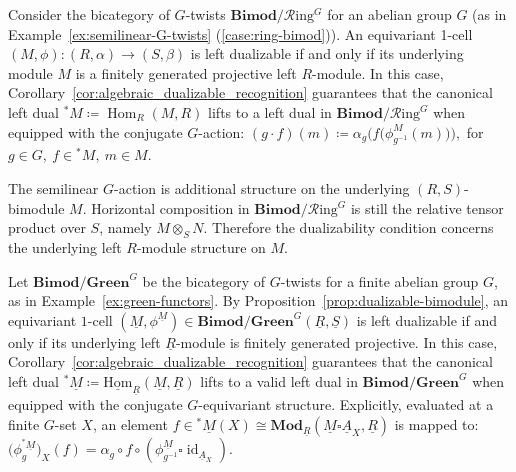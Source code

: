 \documentclass[11pt,oneside]{amsart}
\DeclareMathOperator{\Hom}{Hom}
\DeclareMathOperator{\id}{id}
\numberwithin{equation}{section}
\numberwithin{figure}{section}
\theoremstyle{plain}
\theoremstyle{definition}
\theoremstyle{remark}
\begin{document}
\begin{example}\label{ex:dualizable_equivariant_module}
Consider the bicategory of $G$-twists $\mathbf{Bimod}/\mathcal{R}\mathrm{ing}^G$ for an abelian group $G$ (as in Example~\ref{ex:semilinear-G-twists}
\textup{(\ref{case:ring-bimod})}). An equivariant 1-cell $(M,\phi) \colon (R,\alpha) \to (S,\beta)$ is left dualizable if and only if its underlying module $M$ is a finitely generated projective left $R$-module. In this case, Corollary~\ref{cor:algebraic_dualizable_recognition} guarantees that the canonical left dual ${}^*M \coloneqq \Hom_R(M,R)$ lifts to a left dual in $\mathbf{Bimod}/\mathcal{R}\mathrm{ing}^G$ when equipped with the conjugate $G$-action: $(g\cdot f)(m) \coloneqq \alpha_g\!\Big(f\big(\phi^M_{g^{-1}}(m)\big)\Big), $ for $ g\in G,\ f\in {}^*M,\ m\in M.$

The semilinear \(G\)-action is additional structure on the underlying
\((R,S)\)-bimodule \(M\). Horizontal composition in
\(\mathbf{Bimod}/\mathcal{R}\mathrm{ing}^G\) is still the relative
tensor product over \(S\), namely \(M\otimes_S N\). Therefore the
dualizability condition concerns the underlying left \(R\)-module
structure on \(M\).
\end{example}

 


\begin{example}\label{ex:dualizable_green_functor}
Let $\mathbf{Bimod}/\mathbf{Green}^{G}$ be the bicategory of $G$-twists for a finite abelian group $G$, as in Example~\ref{ex:green-functors}. By Proposition~\ref{prop:dualizable-bimodule}, an equivariant $1$-cell $(\underline M,\phi^{\underline M})\in \mathbf{Bimod}/\mathbf{Green}^{G}(\underline R,\underline S)$ is left dualizable if and only if its underlying left \(\underline R\)-module is finitely generated
projective. In this case, Corollary~\ref{cor:algebraic_dualizable_recognition} guarantees that the canonical left dual ${}^*\underline M \coloneqq \underline{\mathrm{Hom}}_{\underline R}(\underline M,\underline R)$ lifts to a valid left dual in $\mathbf{Bimod}/\mathbf{Green}^{G}$ when equipped with the conjugate $G$-equivariant structure. Explicitly, evaluated at a finite $G$-set $X$, an element $f \in {}^*\underline M(X) \cong \mathbf{Mod}_{\underline R}(\underline{M} \square \underline{A}_X, \underline R)$ is mapped to: $\big(\phi_g^{{}^*\underline M}\big)_X(f) = \alpha_g \circ f \circ (\phi^{\underline M}_{g^{-1}} \square \id_{\underline{A}_X}).$
\end{example}
\end{document}
